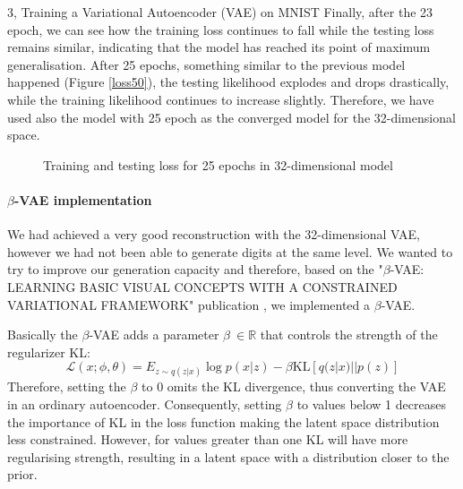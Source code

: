 \begin{task}{3, Training a Variational Autoencoder (VAE) on MNIST}
Finally, after the 23 epoch, we can see how the training loss continues to fall while the testing loss remains similar, indicating that the model has reached its point of maximum generalisation. After 25 epochs, something similar to the previous model happened (Figure \ref{loss50}), the testing likelihood explodes and drops drastically, while the training likelihood continues to increase slightly. Therefore, we have used also the model with 25 epoch as the converged model for the 32-dimensional space.


\begin{figure}[H]
    \centering
    \caption{Training and testing loss for 25 epochs in 32-dimensional model}
    \label{loss25_32}
\end{figure}

\paragraph{\(\beta\)-VAE implementation} We had achieved a very good reconstruction with the 32-dimensional VAE, however we had not been able to generate digits at the same level. We wanted to try to improve our generation capacity and therefore, based on the  "\(\beta\)-VAE: LEARNING BASIC VISUAL CONCEPTS WITH A CONSTRAINED VARIATIONAL FRAMEWORK" publication \cite{higgins2016beta}, we implemented a \(\beta\)-VAE.

Basically the \(\beta\)-VAE adds a parameter \(\beta\ \in \mathbb{R}\) that controls the strength of the regularizer KL:
\[
\mathcal{L}(x;\phi, \theta) = E_{z\sim q(z|x)}\log p(x|z) - \beta \text{KL}[q(z|x)||p(z)]
\]
Therefore, setting the \(\beta\) to 0 omits the KL divergence, thus converting the VAE in an ordinary autoencoder. Consequently, setting \(\beta\) to values below 1 decreases the importance of KL in the loss function making the latent space distribution less constrained. However, for values greater than one KL will have more regularising strength, resulting in a latent space with a distribution closer to the prior.


\end{task}
